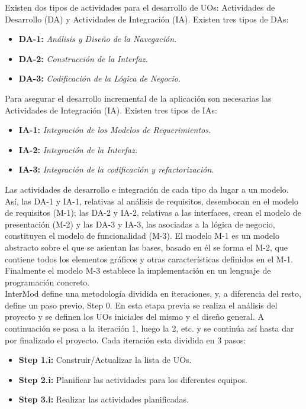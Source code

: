 Existen dos tipos de actividades para el desarrollo de UOs: Actividades de Desarrollo (DA) y Actividades de Integración (IA). Existen tres tipos de DAs:

\begin{itemize}
\item \textbf{DA-1:} \textit{Análisis y Diseño de la Navegación.}
\item \textbf{DA-2:} \textit{Construcción de la Interfaz.}
\item \textbf{DA-3:} \textit{Codificación de la Lógica de Negocio.}
\end{itemize}

Para asegurar el desarrollo incremental de la aplicación son necesarias las Actividades de Integración (IA). Existen tres tipos de IAs:
\begin{itemize}
\item \textbf{IA-1:} \textit{Integración de los Modelos de Requerimientos.}
\item \textbf{IA-2:} \textit{Integración de la Interfaz.}
\item \textbf{IA-3:} \textit{Integración de la codificación y refactorización.}
\end{itemize}

Las actividades de desarrollo e integración de cada tipo da lugar a un modelo. Así, las DA-1 y IA-1, relativas al análisis de requisitos, desembocan en el modelo de requisitos (M-1); las DA-2 y IA-2, relativas a las interfaces, crean el modelo de presentación (M-2) y las DA-3 y IA-3, las asociadas a la lógica de negocio, constituyen el modelo de funcionalidad (M-3). El modelo M-1 es un modelo abstracto sobre el que se asientan las bases, basado en él se forma el M-2, que contiene todos los elementos gráficos y otras características definidos en el M-1. Finalmente el modelo M-3 establece la implementación en un lenguaje de programación concreto.\\

InterMod define una metodología dividida en iteraciones, y, a diferencia del resto, define un paso previo, Step 0. En esta etapa previa se realiza el análisis del proyecto y se definen los UOs iniciales del mismo y el diseño general. A continuación se pasa a la iteración 1, luego la 2, etc. y se continúa así hasta dar por finalizado el proyecto. Cada iteración esta dividida en 3 pasos:

\begin{itemize}
\item \textbf{Step 1.i:} Construir/Actualizar la lista de UOs.
\item \textbf{Step 2.i:} Planificar las actividades para los diferentes equipos.
\item \textbf{Step 3.i:} Realizar las actividades planificadas.
\end{itemize}

